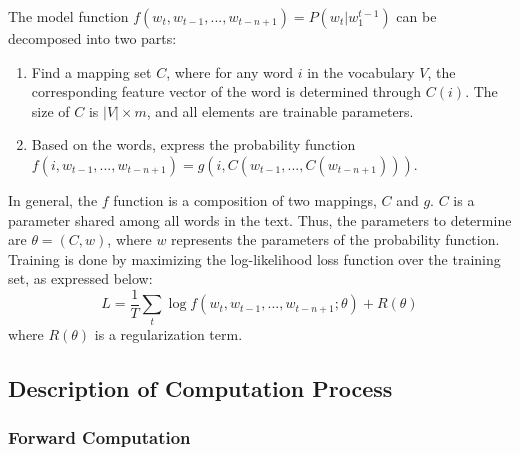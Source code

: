 \documentclass[11p,oneside]{book}
\begin{document}
The model function $f(w_t, w_{t-1}, ..., w_{t-n+1}) = P(w_t|w_1^{t-1})$ can be decomposed into two parts:
\begin{enumerate}
    \item Find a mapping set $C$, where for any word $i$ in the vocabulary $V$, the corresponding feature vector of the word is determined through $C(i)$. The size of $C$ is $|V| \times m$, and all elements are trainable parameters.
    \item Based on the words, express the probability function $f(i, w_{t-1}, ..., w_{t-n+1}) = g(i, C(w_{t-1}, ..., C(w_{t-n+1})))$.
\end{enumerate}

In general, the $f$ function is a composition of two mappings, $C$ and $g$. $C$ is a parameter shared among all words in the text. Thus, the parameters to determine are $\theta = (C, w)$, where $w$ represents the parameters of the probability function. Training is done by maximizing the log-likelihood loss function over the training set, as expressed below:
\[
L = \frac{1}{T} \sum_t \log f(w_t, w_{t-1}, ..., w_{t-n+1}; \theta) + R(\theta)
\]
where $R(\theta)$ is a regularization term.

\subsection*{Description of Computation Process}

\subsubsection*{Forward Computation}
\end{document}
